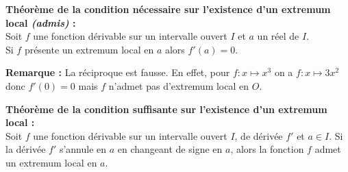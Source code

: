 \documentclass[11pt,a4paper]{article}
\begin{document}
\begin{minipage}{0.4\textwidth}
\end{minipage}
\hspace{0.05\textwidth}
\begin{minipage}{0.55\textwidth}
    \begin{mdframed}[style=proprieteStyle]
        \textbf{Théorème de la condition nécessaire sur l'existence d'un extremum local \emph{(admis)} :} ~\\
        Soit $f$ une fonction dérivable sur un intervalle ouvert $I$ et $a$ un réel de $I$. \\
        Si $f$ présente un extremum local en $a$ alors $f'(a)=0$.
    \end{mdframed}
    \textbf{Remarque :} La réciproque est fausse. En effet, pour $f:x\mapsto x^3$ on a $f:x\mapsto 3x^2$ donc $f'(0)=0$
    mais $f$ n'admet pas d'extremum local en $O$.
\end{minipage}

\begin{mdframed}[style=proprieteStyle]
    \textbf{Théorème de la condition suffisante sur l'existence d'un extremum local :} ~\\
    Soit $f$ une fonction dérivable sur un intervalle ouvert $I$, de dérivée $f'$ et $a\in I$.
    Si la dérivée $f'$ s'annule en $a$ en changeant de signe en $a$, alors la fonction $f$ admet un extremum local en $a$.
\end{mdframed}
\end{document}
